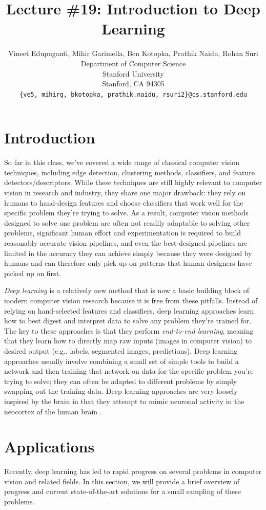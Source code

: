 \documentclass{article}
\title{Lecture \#19: Introduction to Deep Learning}
\author{
  Vineet Edupuganti, Mihir Garimella, Ben Kotopka, Prathik Naidu, Rohan Suri \\
  Department of Computer Science\\
  Stanford University\\
  Stanford, CA 94305 \\
  \texttt{\{ve5, mihirg, bkotopka, prathik.naidu, rsuri2\}@cs.stanford.edu} \\
}
\begin{document}
\maketitle

\section{Introduction}
So far in this class, we've covered a wide range of classical computer vision techniques, including edge detection, clustering methods, classifiers, and feature detectors/descriptors. While these  techniques are still highly relevant to computer vision in research and industry, they share one major drawback: they rely on humans to hand-design features and choose classifiers that work well for the specific problem they're trying to solve. As a result, computer vision methods designed to solve one problem are often not readily adaptable to solving other problems, significant human effort and experimentation is required to build reasonably accurate vision pipelines, and even the best-designed pipelines are limited in the accuracy they can achieve simply because they were designed by humans and can therefore only pick up on patterns that human designers have picked up on first.

\textit{Deep learning} is a relatively new method that is now a basic building block of modern computer vision research because it is free from these pitfalls. Instead of relying on hand-selected features and classifiers, deep learning approaches learn how to best digest and interpret data to solve any problem they're trained for. The key to these approaches is that they perform \textit{end-to-end learning}, meaning that they learn how to directly map raw inputs (images in computer vision) to desired output (e.g., labels, segmented images, predictions). Deep learning approaches usually involve combining a small set of simple tools to build a network and then training that network on data for the specific problem you're trying to solve; they can often be adapted to different problems by simply swapping out the training data. Deep learning approaches are very loosely inspired by the brain in that they attempt to mimic neuronal activity in the neocortex of the human brain \cite{hof_2016}.

\section{Applications}
Recently, deep learning has led to rapid progress on several problems in computer vision and related fields. In this section, we will provide a brief overview of progress and current state-of-the-art solutions for a small sampling of these problems.
\end{document}
